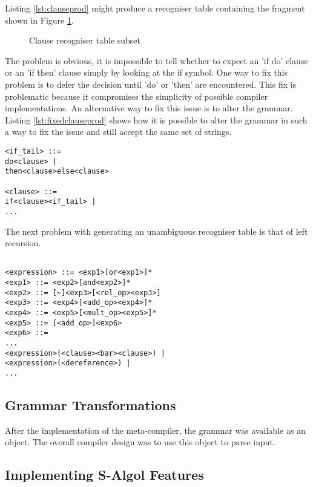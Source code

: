 \documentclass{article}
\begin{document}
Listing \ref{lst:clauseprod} might produce a recogniser table containing the fragment shown in Figure \ref{fig:incorrectrecogniserobj}. 

\begin{figure}[htbp]
  \centering
  
  \caption{Clause recogniser table subset}
  \label{fig:incorrectrecogniserobj}
\end{figure}

The problem is obvious, it is impossible to tell whether to expect an 'if do' clause or an 'if then' clause simply by looking at the if symbol. One way to fix this problem is to defer the decision until 'do' or 'then' are encountered. This fix is problematic because it compromises the simplicity of possible compiler implementations. An alternative way to fix this issue is to alter the grammar. Listing \ref{lst:fixedclauseprod} shows how it is possible to alter the grammar in such a way to fix the issue and still accept the same set of strings.

\begin{lstlisting}[caption={LL(1) <clause> production},label={lst:fixedclauseprod}]
<if_tail> ::=
do<clause> |
then<clause>else<clause>

<clause> ::=
if<clause><if_tail> |
...
\end{lstlisting}

The next problem with generating an unambiguous recogniser table is that of left recursion.  

\begin{lstlisting}[caption={Fragment of the <clause> production},label={lst:clauseprod}]
      
<expression> ::= <exp1>[or<exp1>]*
<exp1> ::= <exp2>[and<exp2>]*
<exp2> ::= [~]<exp3>[<rel_op><exp3>]
<exp3> ::= <exp4>[<add_op><exp4>]*
<exp4> ::= <exp5>[<mult_op><exp5>]*
<exp5> ::= [<add_op>]<exp6>
<exp6> ::= 
...
<expression>(<clause><bar><clause>) |
<expression>(<dereference>) | 
...
\end{lstlisting}


\subsection{Grammar Transformations}

After the implementation of the meta-compiler, the grammar was available as an object. The overall compiler design was to use this object to parse input. 

\subsection{Implementing S-Algol Features}
\end{document}

